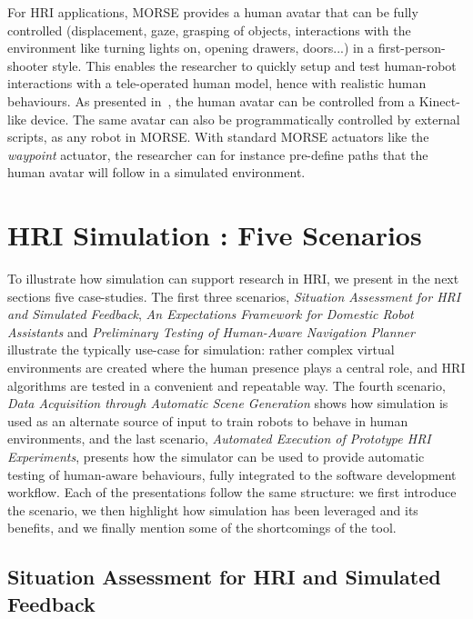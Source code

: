 \documentclass[letterpaper, 10pt, conference]{ieeeconf}
\begin{document}
For HRI applications, MORSE provides a human avatar that can be fully controlled
(displacement, gaze, grasping of objects, interactions with the environment like
turning lights on, opening drawers, doors...) in a first-person-shooter style.
This enables the researcher to quickly setup and test human-robot interactions
with a tele-operated human model, hence with realistic human behaviours. As
presented in~\cite{lemaignan2012morse}, the human avatar can be controlled from
a Kinect-like device.  The same avatar can also be programmatically controlled
by external scripts, as any robot in MORSE. With standard MORSE actuators like
the \emph{waypoint} actuator, the researcher can for instance pre-define paths
that the human avatar will follow in a simulated environment.



\section{HRI Simulation : Five Scenarios}

To illustrate how simulation can support research in HRI, we present in the next
sections five case-studies.  The first three scenarios, \emph{Situation
Assessment for HRI and Simulated Feedback}, \emph{An Expectations Framework for
Domestic Robot Assistants} and \emph{Preliminary Testing of Human-Aware
Navigation Planner} illustrate the typically use-case for simulation: rather
complex virtual environments are created where the human presence plays a
central role, and HRI algorithms are tested in a convenient and repeatable way.
The fourth scenario, \emph{Data Acquisition through Automatic Scene Generation}
shows how simulation is used as an alternate source of input to train robots to
behave in human environments, and the last scenario, \emph{Automated Execution
of Prototype HRI Experiments}, presents how the simulator can be used to provide
automatic testing of human-aware behaviours, fully integrated to the software
development workflow. Each of the presentations follow the same structure: we
first introduce the scenario, we then highlight how simulation has been leveraged
and its benefits, and we finally mention some of the shortcomings of the tool.

\subsection{Situation Assessment for HRI and Simulated Feedback}
\label{sc:assessment}
\end{document}
